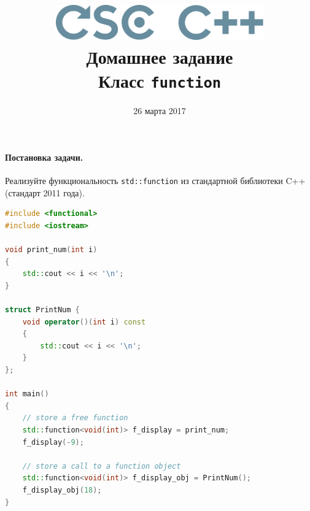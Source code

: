 \documentclass[a4paper,10pt]{article}
\begin{document}

\lstset{
  basicstyle=\ttfamily,
  columns=fullflexible
}

\newcommand{\cpp}[1]{{\tt #1}}

\title{\includegraphics[height=15mm]{../CSCCPP}\\[1em]
Домашнее задание  \\ Класс \cpp{function}}
\preauthor{}
\author{}
\postauthor{}
\date{26 марта 2017}

\maketitle

\paragraph{Постановка задачи.}
Реализуйте функциональность \cpp{std::function} из стандартной библиотеки C++ (стандарт 2011 года).
\begin{lstlisting}[language=c++,frame=single]
#include <functional>
#include <iostream>
 
void print_num(int i)
{
    std::cout << i << '\n';
}
 
struct PrintNum {
    void operator()(int i) const
    {
        std::cout << i << '\n';
    }
};
 
int main()
{
    // store a free function
    std::function<void(int)> f_display = print_num;
    f_display(-9);
 
    // store a call to a function object
    std::function<void(int)> f_display_obj = PrintNum();
    f_display_obj(18);
}
\end{lstlisting}
\end{document}
